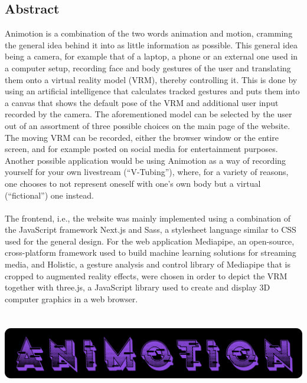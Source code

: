 \begin{spacing}{1}
    \chapter*{Abstract}
\end{spacing}
Animotion is a combination of the two words animation and motion, cramming the general idea behind it into as little information as possible. This general idea being a camera, for example that of a laptop, a phone or an external one used in a computer setup, recording face and body gestures of the user and translating them onto a virtual reality model (VRM), thereby controlling it. This is done by using an artificial intelligence that calculates tracked gestures and puts them into a canvas that shows the default pose of the VRM and additional user input recorded by the camera. The aforementioned model can be selected by the user out of an assortment of three possible choices on the main page of the website. The moving VRM can be recorded, either the browser window or the entire screen, and for example posted on social media for entertainment purposes. Another possible application would be using Animotion as a way of recording yourself for your own livestream (“V-Tubing”), where, for a variety of reasons, one chooses to not represent oneself with one’s own body but a virtual (“fictional”) one instead.
\\
\\
The frontend, i.e., the website was mainly implemented using a combination of the JavaScript framework Next.js and Sass, a stylesheet language similar to CSS used for the general design. For the web application Mediapipe, an open-source, cross-platform framework used to build machine learning solutions for streaming media, and Holistic, a gesture analysis and control library of Mediapipe that is cropped to augmented reality effects, were chosen in order to depict the VRM together with three.js, a JavaScript library used to create and display 3D computer graphics in a web browser.
\\
\\
\\
\includegraphics[width=1\textwidth]{pics/animotionlogo.png}

